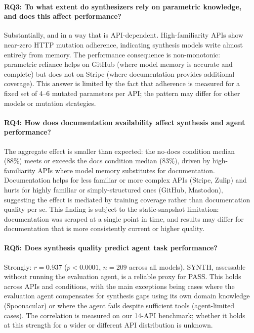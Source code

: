 \paragraph{RQ3: To what extent do synthesizers rely on parametric knowledge, and does this affect performance?}
Substantially, and in a way that is API-dependent. High-familiarity APIs show near-zero HTTP mutation adherence, indicating synthesis models write almost entirely from memory. The performance consequence is non-monotonic: parametric reliance helps on GitHub (where model memory is accurate and complete) but does not on Stripe (where documentation provides additional coverage). This answer is limited by the fact that adherence is measured for a fixed set of 4--6 mutated parameters per API; the pattern may differ for other models or mutation strategies.

\paragraph{RQ4: How does documentation availability affect synthesis and agent performance?}
The aggregate effect is smaller than expected: the no-docs condition median (88\%) meets or exceeds the docs condition median (83\%), driven by high-familiarity APIs where model memory substitutes for documentation. Documentation helps for less familiar or more complex APIs (Stripe, Zulip) and hurts for highly familiar or simply-structured ones (GitHub, Mastodon), suggesting the effect is mediated by training coverage rather than documentation quality per se. This finding
is subject to the static-snapshot limitation: documentation was scraped at a single point in time, and results may differ for documentation that is more consistently current or higher quality.

\paragraph{RQ5: Does synthesis quality predict agent task performance?}
Strongly: $r = 0.937$ ($p < 0.0001$, $n = 209$ across all models). SYNTH, assessable without running the evaluation agent, is a reliable proxy for PASS. This holds across APIs and conditions, with the main exceptions being cases where the
evaluation agent compensates for synthesis gaps using its own domain knowledge (Spoonacular) or where the agent fails despite sufficient tools (agent-limited cases). The correlation is measured on our 14-API benchmark; whether it holds at this strength for a wider or different API distribution is unknown.

